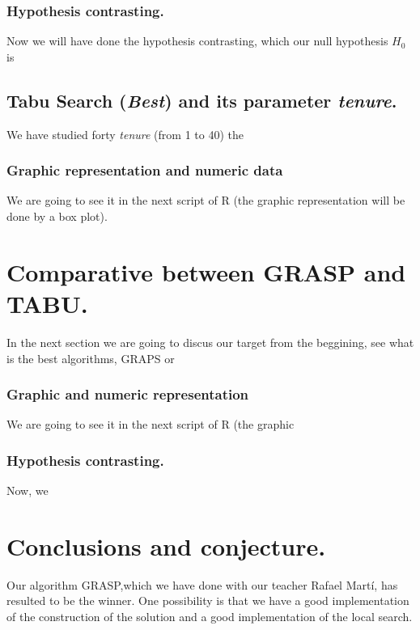 \documentclass[11pt, english]{article}
\begin{document}
\subsubsection{Hypothesis contrasting.}
Now we will have done the hypothesis contrasting, which our null hypothesis $H_0$ is 
\subsection{Tabu Search (\textit{Best}) and its parameter \textit{tenure}.}
We have studied forty \textit{tenure} (from 1 to 40) the 


\subsubsection{Graphic representation and numeric data}
We are going to see it in the next script of R (the graphic representation will be done by a box plot).


\section{Comparative between GRASP and TABU.}
In the next section we are going to discus our target from the beggining, see what is the best algorithms, GRAPS or 

\subsubsection{Graphic and numeric representation}

We are going to see it in the next script of R (the graphic 


\subsubsection{Hypothesis contrasting.}
Now, we

\section{Conclusions and conjecture.}
Our algorithm GRASP,which we have done with our teacher Rafael Martí, has resulted to be the winner. One possibility is that we have a good implementation of the construction of the solution and a good implementation of the local search. \\


\end{document}
